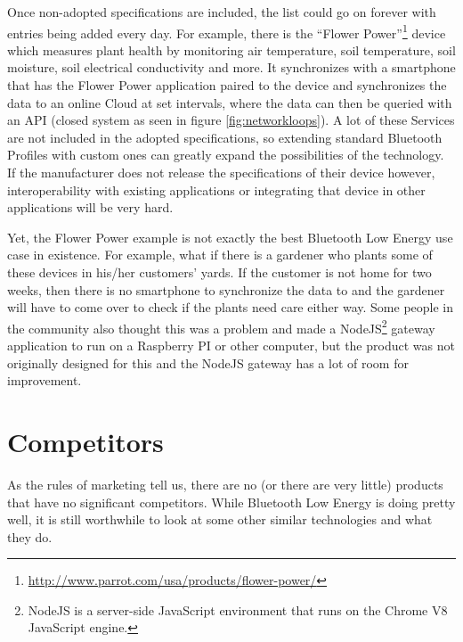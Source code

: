 \documentclass[pdftex,a4paper,12pt,twoside]{report}
\begin{document}
Once non-adopted specifications are included, the list could go on forever with entries being added every day. For example, there is the ``Flower Power''\footnote{\url{http://www.parrot.com/usa/products/flower-power/}} device which measures plant health by monitoring air temperature, soil temperature, soil moisture, soil electrical conductivity and more. It synchronizes with a smartphone that has the Flower Power application paired to the device and synchronizes the data to an online Cloud at set intervals, where the data can then be queried with an API (closed system as seen in figure \ref{fig:networkloops}). A lot of these Services are not included in the adopted specifications, so extending standard Bluetooth Profiles with custom ones can greatly expand the possibilities of the technology. If the manufacturer does not release the specifications of their device however, interoperability with existing applications or integrating that device in other applications will be very hard.

Yet, the Flower Power example is not exactly the best Bluetooth Low Energy use case in existence. For example, what if there is a gardener who plants some of these devices in his/her customers' yards. If the customer is not home for two weeks, then there is no smartphone to synchronize the data to and the gardener will have to come over to check if the plants need care either way. Some people in the community also thought this was a problem and made a NodeJS\footnote{NodeJS is a server-side JavaScript environment that runs on the Chrome V8 JavaScript engine.} gateway application to run on a Raspberry PI or other computer, but the product was not originally designed for this and the NodeJS gateway has a lot of room for improvement.

\section{Competitors}
\label{sec:competitors}
As the rules of marketing tell us, there are no (or there are very little) products that have no significant competitors. While Bluetooth Low Energy is doing pretty well, it is still worthwhile to look at some other similar technologies and what they do.
\end{document}

